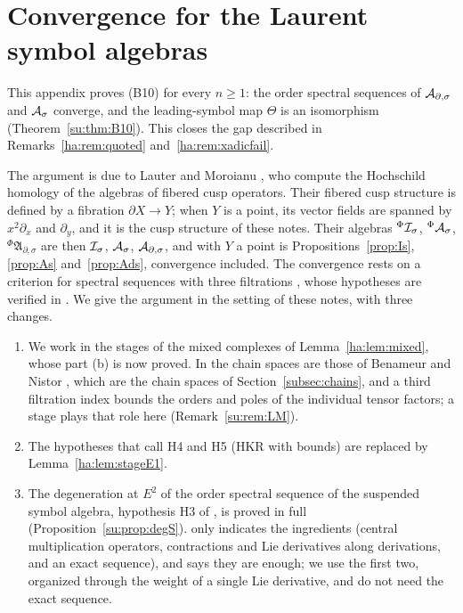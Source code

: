 \section{Convergence for the Laurent symbol algebras}\label{su:sec}

\providecommand{\fA}{\mathfrak A}
\providecommand{\hot}{\mathbin{\widehat\otimes}}
\newcommand{\Ssym}{\mathcal S}
\newcommand{\Gsym}{\mathcal G}
\newcommand{\Omh}{\Omega_{\mathrm h}}

This appendix proves (B10) for every \(n\ge1\): the order spectral
sequences of \(\mathcal A_{\partial,\sigma}\) and \(\mathcal A_\sigma\) converge, and the leading-symbol map
\(\Theta\) is an isomorphism (Theorem~\ref{su:thm:B10}). This closes the
gap described in Remarks~\ref{ha:rem:quoted} and~\ref{ha:rem:xadicfail}.

The argument is due to Lauter and Moroianu \cite{LauterMoroianu}, who
compute the Hochschild homology of the algebras of fibered cusp
operators. Their fibered cusp structure is defined by a fibration
\(\partial X\to Y\); when \(Y\) is a point, its vector fields are spanned
by \(x^2\partial_x\) and \(\partial_y\), and it is the cusp structure of
these notes. Their algebras \({}^\Phi\mathcal I_\sigma\), \({}^\Phi\mathcal A_\sigma\),
\({}^\Phi\fA_{\partial,\sigma}\) are then \(\mathcal I_\sigma\), \(\mathcal A_\sigma\), \(\mathcal A_{\partial,\sigma}\), and
\cite[Thm.~5.3]{LauterMoroianu} with \(Y\) a point is
Propositions~\ref{prop:Is}, \ref{prop:As} and~\ref{prop:Ads}, convergence
included. The convergence rests on a criterion for spectral sequences with
three filtrations \cite[Thm.~B.4]{LauterMoroianu}, whose hypotheses are
verified in \cite[\S5]{LauterMoroianu}. We give the argument in the
setting of these notes, with three changes.
\begin{enumerate}
\item We work in the stages of the mixed complexes of
Lemma~\ref{ha:lem:mixed}, whose part (b) is now proved. In
\cite{LauterMoroianu} the chain spaces are those of Benameur and Nistor
\cite{BNcomplete}, which are
the chain spaces of Section~\ref{subsec:chains}, and a third filtration
index bounds the orders and poles of the individual tensor factors; a
stage plays that role here (Remark~\ref{su:rem:LM}).
\item The hypotheses that \cite{LauterMoroianu} call H4 and H5 (HKR with
bounds) are replaced by Lemma~\ref{ha:lem:stageE1}.
\item The degeneration at \(E^2\) of the order spectral sequence of the
suspended symbol algebra, hypothesis H3 of \cite{LauterMoroianu}, is
proved in full (Proposition~\ref{su:prop:degS}).
\cite[Prop.~5.1]{LauterMoroianu} only indicates the ingredients (central
multiplication operators, contractions and Lie derivatives along
derivations, and an exact sequence), and says they are enough; we use the
first two, organized through the weight of a single Lie derivative, and
do not need the exact sequence.
\end{enumerate}

